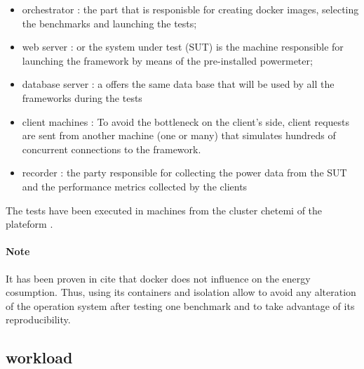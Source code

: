 \begin{itemize}
    \item orchestrator : the part that is responisble for creating docker images, selecting the benchmarks and launching the tests;
    \item web server : or the system under test (SUT) is the machine  responsible for launching the framework  by means of the pre-installed powermeter;
    \item database server : a offers the same data base that will be used by all the frameworks during the tests
    \item client machines : To avoid the bottleneck on the client's side, client requests are sent from another machine (one or many) that simulates hundreds of concurrent connections to the framework.
    \item recorder : the party responsible for collecting the power data from the SUT and the performance metrics collected by the clients 
\end{itemize}

The tests have been executed in machines from the cluster chetemi of the  plateform .

\paragraph{Note}
It has been proven in {cite } that docker does not influence on the energy cosumption. Thus, using its containers and isolation allow to avoid any alteration of the operation system after testing one benchmark and to take advantage of its reproducibility.

\subsection{workload}


